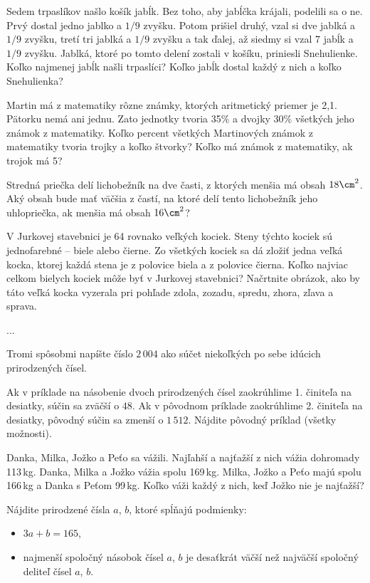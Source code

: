 {%
Sedem trpaslíkov našlo košík jabĺk. Bez toho, aby jabĺčka krájali, podelili sa o ne. Prvý dostal
jedno jablko a $1/9$ zvyšku. Potom prišiel druhý, vzal si dve jablká a $1/9$ zvyšku, tretí tri jablká
a $1/9$ zvyšku a tak ďalej, až siedmy si vzal 7 jabĺk a $1/9$ zvyšku. Jablká, ktoré po tomto delení
zostali v košíku, priniesli Snehulienke. Koľko najmenej jabĺk našli trpaslíci? Koľko jabĺk
dostal každý z nich a koľko Snehulienka?}

{%
Martin má z matematiky rôzne známky, ktorých aritmetický priemer je 2,1. Pätorku nemá ani
jednu. Zato jednotky tvoria 35\% a dvojky 30\% všetkých jeho známok z matematiky.
Koľko percent všetkých Martinových známok z matematiky tvoria trojky a koľko štvorky?
Koľko má známok z matematiky, ak trojok má 5?}

{%
Stredná priečka delí lichobežník na dve časti, z ktorých menšia má obsah $18\cm^2$. Aký obsah
bude mať väčšia z častí, na ktoré delí tento lichobežník jeho uhlopriečka, ak menšia má obsah
$16\cm^2$?}

{%
V Jurkovej stavebnici je 64 rovnako veľkých kociek. Steny týchto kociek sú jednofarebné --
biele alebo čierne. Zo všetkých kociek sa dá zložiť jedna veľká kocka, ktorej každá stena je
z polovice biela a z polovice čierna. Koľko najviac celkom bielych kociek môže byť
v Jurkovej stavebnici? Načrtnite obrázok, ako by táto veľká kocka vyzerala pri pohľade zdola,
zozadu, spredu, zhora, zľava a sprava.}

{%
...}

{%
Tromi spôsobmi napíšte číslo $2\,004$ ako súčet niekoľkých po sebe idúcich prirodzených čísel.}

{%
Ak v príklade na násobenie dvoch prirodzených čísel zaokrúhlime 1. činiteľa na desiatky,
súčin sa zväčší o $48$. Ak v pôvodnom príklade zaokrúhlime 2. činiteľa na desiatky, pôvodný
súčin sa zmenší o $1\,512$. Nájdite pôvodný príklad (všetky možnosti).}

{%
Danka, Milka, Jožko a Peťo sa vážili. Najľahší a najťažší z nich vážia dohromady 113\,kg.
Danka, Milka a Jožko vážia spolu 169\,kg. Milka, Jožko a Peťo majú spolu 166\,kg a Danka
s Peťom 99\,kg. Koľko váži každý z nich, keď Jožko nie je najťažší?}

{%
Nájdite prirodzené čísla $a$, $b$, ktoré spĺňajú podmienky:
\begin{itemize}
\item $3a+b=165$,
\item najmenší spoločný násobok čísel $a$, $b$ je desaťkrát väčší než najväčší spoločný deliteľ
čísel $a$, $b$.
\end{itemize}
}

